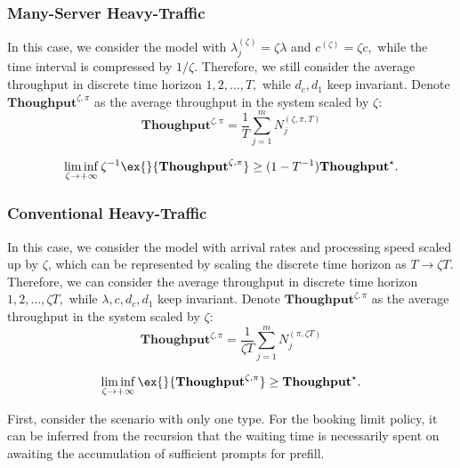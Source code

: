 \documentclass[opre, nonblindrev]{informs3} %
\newcommand{\throughput}{\textbf{Thoughput}}
\begin{document}
\subsubsection{Many-Server Heavy-Traffic}
In this case, we consider the model with $\lambda_j^{(\zeta)} = \zeta\lambda$ and $c^{(\zeta)} = \zeta c,$ while the time interval is compressed by $1/\zeta.$ Therefore, we still consider the average throughput in discrete time horizon $1,2,\dots,T,$ while $d_c,d_1$ keep invariant. Denote $\throughput^{\zeta,\pi}$ as the average throughput in the system scaled by $\zeta$:
\begin{equation*}
    \throughput^{\zeta,\pi} = \frac{1}{T}\sum_{j=1}^m N_j^{(\zeta,\pi,T)}
\end{equation*}
\begin{theorem}
    \label{thm:many_server}
    \begin{equation*}
        \liminf_{\zeta\to+\infty}\zeta^{-1} \ex{}{\throughput^{\zeta,\pi}} \ge (1-T^{-1})\throughput^\star.
    \end{equation*}
\end{theorem}
\subsubsection{Conventional Heavy-Traffic}
In this case, we consider the model with arrival rates and processing speed scaled up by $\zeta$, which can be represented by scaling the discrete time horizon as $T\to \zeta T.$ Therefore, we can consider the average throughput in discrete time horizon $1,2,\dots,\zeta T,$ while $\lambda,c,d_c,d_1$ keep invariant. Denote $\throughput^{\zeta,\pi}$ as the average throughput in the system scaled by $\zeta$:
\begin{equation*}
    \throughput^{\zeta,\pi} = \frac{1}{\zeta T}\sum_{j=1}^m N_j^{(\pi,\zeta T)}
\end{equation*}
\begin{theorem}
    \label{thm:many_server}
    \begin{equation*}
        \liminf_{\zeta\to+\infty} \ex{}{\throughput^{\zeta,\pi}} \ge \throughput^\star.
    \end{equation*}
\end{theorem}

First, consider the scenario with only one type. For the booking limit policy, it can be inferred from the recursion that the waiting time is necessarily spent on awaiting the accumulation of sufficient prompts for prefill.
\end{document}
